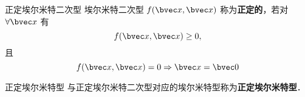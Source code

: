 \begin{definition}{正定埃尔米特二次型}
埃尔米特二次型 $f(\bvec x,\bvec x)$ 称为\textbf{正定的}，若对 $\forall \bvec x$ 有
\begin{equation}
f(\bvec x,\bvec x)\geq0,
\end{equation}
且
\begin{equation}
f(\bvec x,\bvec x)=0\Rightarrow\bvec x=\bvec 0
\end{equation}
\end{definition}
\begin{definition}{正定埃尔米特型}\label{HeFor_def1}
与正定埃尔米特二次型对应的埃尔米特型称为\textbf{正定埃尔米特型}．
\end{definition}